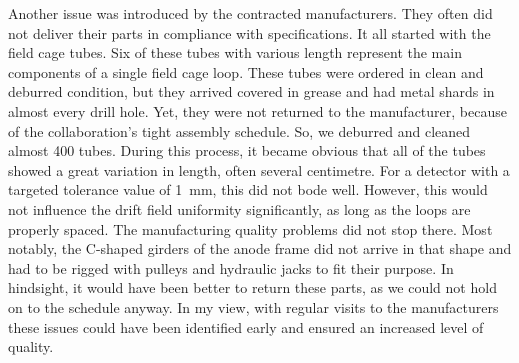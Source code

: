Another issue was introduced by the contracted manufacturers. They often did not deliver their parts in compliance with specifications. It all started with the field cage tubes. Six of these tubes with various length represent the main components of a single field cage loop. These tubes were ordered in clean and deburred condition, but they arrived covered in grease and had metal shards in almost every drill hole. Yet, they were not returned to the manufacturer, because of the collaboration's tight assembly schedule. So, we deburred and cleaned almost \num{400} tubes. During this process, it became obvious that all of the tubes showed a great variation in length, often several centimetre. For a detector with a targeted tolerance value of \SI{1}{\milli\metre}, this did not bode well. However, this would not influence the drift field uniformity significantly, as long as the loops are properly spaced. The manufacturing quality problems did not stop there. Most notably, the C-shaped girders of the anode frame did not arrive in that shape and had to be rigged with pulleys and hydraulic jacks to fit their purpose. In hindsight, it would have been better to return these parts, as we could not hold on to the schedule anyway. In my view, with regular visits to the manufacturers these issues could have been identified early and ensured an increased level of quality.

